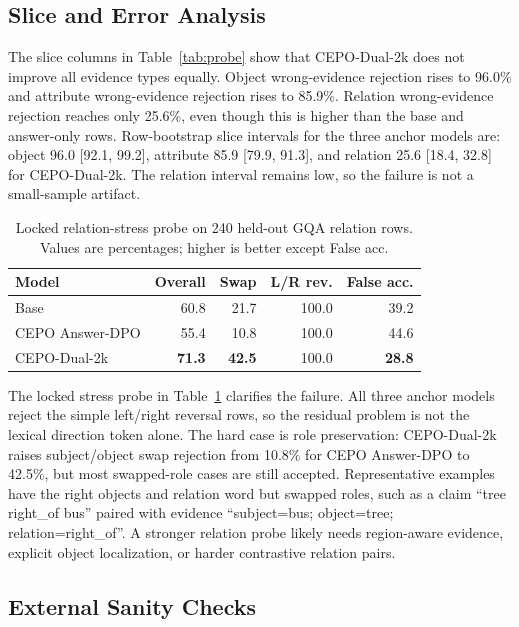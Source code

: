 \documentclass[10pt,twocolumn,letterpaper]{article}
\newcommand{\answerdpo}{CEPO Answer-DPO}
\newcommand{\dualtwok}{CEPO-Dual-2k}
\begin{document}
\subsection{Slice and Error Analysis}

The slice columns in Table~\ref{tab:probe} show that \dualtwok{} does not
improve all evidence types equally. Object wrong-evidence rejection rises to
96.0\% and attribute wrong-evidence rejection rises to 85.9\%. Relation
wrong-evidence rejection reaches only 25.6\%, even though this is higher than
the base and answer-only rows. Row-bootstrap slice intervals for the three
anchor models are: object 96.0 [92.1, 99.2], attribute 85.9 [79.9, 91.3], and
relation 25.6 [18.4, 32.8] for \dualtwok{}. The relation interval remains low,
so the failure is not a small-sample artifact.

\begin{table}[t]
\centering
\scriptsize
\setlength{\tabcolsep}{3pt}
\begin{tabular}{@{}lrrrr@{}}
\toprule
Model & Overall & Swap & L/R rev. & False acc. \\
\midrule
Base & 60.8 & 21.7 & 100.0 & 39.2 \\
\answerdpo{} & 55.4 & 10.8 & 100.0 & 44.6 \\
\dualtwok{} & \textbf{71.3} & \textbf{42.5} & 100.0 & \textbf{28.8} \\
\bottomrule
\end{tabular}
\caption{Locked relation-stress probe on 240 held-out GQA relation rows.
Values are percentages; higher is better except False acc.}
\label{tab:relation_stress}
\end{table}

The locked stress probe in Table~\ref{tab:relation_stress} clarifies the
failure. All three anchor models reject the simple left/right reversal rows,
so the residual problem is not the lexical direction token alone. The hard
case is role preservation: \dualtwok{} raises subject/object swap rejection
from 10.8\% for \answerdpo{} to 42.5\%, but most swapped-role cases are still
accepted. Representative examples have the right objects and relation word but
swapped roles, such as a claim ``tree right\_of bus'' paired with evidence
``subject=bus; object=tree; relation=right\_of''. A stronger relation probe
likely needs region-aware evidence, explicit object localization, or harder
contrastive relation pairs.

\subsection{External Sanity Checks}
\end{document}
